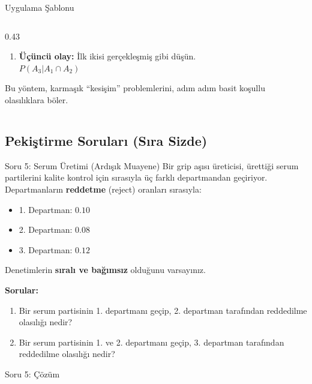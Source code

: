 \documentclass[light]{lutbeamer}
\begin{document}
\begin{frame}[fragile]{Uygulama Şablonu}
\begin{columns}[T]
\begin{column}{0.43\textwidth}
\begin{enumerate}
                \item \textbf{Üçüncü olay:} İlk ikisi gerçekleşmiş gibi düşün.
                \\ $P(A_3|A_1 \cap A_2)$
            \end{enumerate}
            
            \vspace{0.3cm}
            Bu yöntem, karmaşık ``kesişim'' problemlerini, adım adım basit koşullu olasılıklara böler.
        \end{column}
    \end{columns}
\end{frame}

\subsection{Pekiştirme Soruları (Sıra Sizde)}

\begin{frame}{Soru 5: Serum Üretimi (Ardışık Muayene)}
    Bir grip aşısı üreticisi, ürettiği serum partilerini kalite kontrol için sırasıyla üç farklı departmandan geçiriyor. Departmanların \textbf{reddetme} (reject) oranları sırasıyla:
    \begin{itemize}
        \item 1. Departman: $0.10$
        \item 2. Departman: $0.08$
        \item 3. Departman: $0.12$
    \end{itemize}
    Denetimlerin \textbf{sıralı ve bağımsız} olduğunu varsayınız.
    
    \vspace{0.2cm}
    \textbf{Sorular:}
    \begin{enumerate}
        \item[(a)] Bir serum partisinin 1. departmanı geçip, 2. departman tarafından reddedilme olasılığı nedir?
        \item[(b)] Bir serum partisinin 1. ve 2. departmanı geçip, 3. departman tarafından reddedilme olasılığı nedir?
    \end{enumerate}
\end{frame}

\begin{frame}{Soru 5: Çözüm}
    \vspace{5cm} 
\end{frame}
\end{document}
